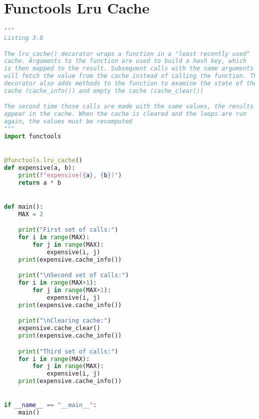 \documentclass[a4paper,landscape]{report}
\begin{document}
\section{Functools Lru Cache}
\begin{lstlisting}[language=Python]
"""
Listing 3.8

The lru_cache() decorator wraps a function in a "least recently used"
cache. Arguments to the function are used to build a hash key, which
is then mapped to the result. Subsequent calls with the same arguments
will fetch the value from the cache instead of calling the function. The
decorator also adds methods to the function to examine the state of the
cache (cache_info()) and empty the cache (cache_clear())

The second time those calls are made with the same values, the results
appear in the cache. When the cache is cleared and the loops are run
again, the values must be recomputed
"""
import functools


@functools.lru_cache()
def expensive(a, b):
    print(f"expensive({a}, {b})")
    return a * b


def main():
    MAX = 2

    print("First set of calls:")
    for i in range(MAX):
        for j in range(MAX):
            expensive(i, j)
    print(expensive.cache_info())

    print("\nSecond set of calls:")
    for i in range(MAX+1):
        for j in range(MAX+1):
            expensive(i, j)
    print(expensive.cache_info())

    print("\nClearing cache:")
    expensive.cache_clear()
    print(expensive.cache_info())

    print("Third set of calls:")
    for i in range(MAX):
        for j in range(MAX):
            expensive(i, j)
    print(expensive.cache_info())


if __name__ == "__main__":
    main()

\end{lstlisting}
\end{document}
